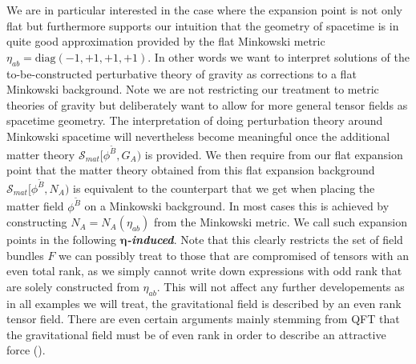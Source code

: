 \documentclass[a4paper,12pt, DIV=14, BCOR=5mm, twoside, headsepline, numbers=noenddot]{scrbook}
\begin{document}
We are in particular interested in the case where the expansion point is not only flat but furthermore supports our intuition that the geometry of spacetime is in quite good approximation provided by the flat Minkowski metric $\eta_{ab} = \mathrm{diag}(-1,+1,+1,+1)$. 
%
%
In other words we want to interpret solutions of the to-be-constructed perturbative theory of gravity as corrections to a flat Minkowski background. Note we are not restricting our treatment to metric theories of gravity but deliberately want to allow for more general tensor fields as spacetime geometry.
The interpretation of doing perturbation theory around Minkowski spacetime will nevertheless become meaningful once the additional matter theory $\mathcal{S}_{mat}[\phi^{\tilde{B}},G_A)$ is provided. We then require from our flat expansion point that the matter theory obtained from this flat expansion background $\mathcal{S}_{mat}[\phi^{\tilde{B}},N_A)$ is equivalent to the counterpart that we get when placing the matter field $\phi^{\tilde{B}}$ on a Minkowski background. 
In most cases this is achieved by constructing $N_A = N_A(\eta_{ab})$ from the Minkowski metric. We call such expansion points in the following \textit{\textbf{$\boldsymbol{\eta}$-induced}}. Note that this clearly restricts the set of field bundles $F$ we can possibly treat to those that are compromised of tensors with an even total rank, as we simply cannot write down expressions with odd rank that are solely constructed from $\eta_{ab}$. This will not affect any further developements as in all examples we will treat, the gravitational field is described by an even rank tensor field. There are even certain arguments mainly stemming from QFT that the gravitational field must be of even rank in order to describe an attractive force (\cite{vecchiato2017variational}). \\
\end{document}
